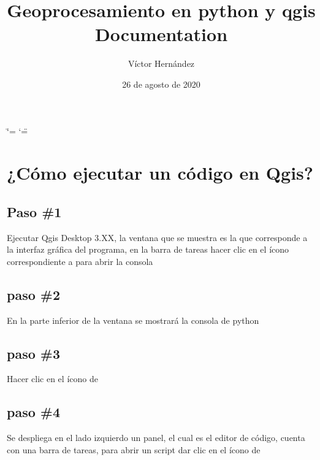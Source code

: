 \documentclass[letterpaper,10pt,spanish]{sphinxmanual}
\title{Geoprocesamiento en python y qgis Documentation}
\date{26 de agosto de 2020}
\author{Víctor Hernández}
\begin{document}
\ifdefined\shorthandoff
  \ifnum\catcode`\=\string=\active\shorthandoff{=}\fi
  \ifnum\catcode`\"=\active{}\fi
\fi

\pagestyle{empty}
\sphinxmaketitle
\pagestyle{plain}
\sphinxtableofcontents
\pagestyle{normal}
\label{\detokenize{index::doc}}



\chapter{¿Cómo ejecutar un código en Qgis?}
\label{\detokenize{ejecucion:como-ejecutar-un-codigo-en-qgis}}\label{\detokenize{ejecucion::doc}}

\section{Paso \#1}
\label{\detokenize{ejecucion:paso-1}}
Ejecutar Qgis Desktop 3.XX, la ventana que se muestra es la que
corresponde a la interfaz gráfica del programa, en la barra de tareas
hacer clic en el ícono correspondiente a  para abrir la consola

\noindent{}


\section{paso \#2}
\label{\detokenize{ejecucion:paso-2}}
En la parte inferior de la ventana se mostrará la consola de python

\noindent{}


\section{paso \#3}
\label{\detokenize{ejecucion:paso-3}}
Hacer clic en el ícono de 

\noindent{}


\section{paso \#4}
\label{\detokenize{ejecucion:paso-4}}
Se despliega en el lado izquierdo un panel, el cual es el editor
de código, cuenta con una barra de tareas, para abrir un script
dar clic en el ícono de 

\noindent{}
\end{document}
